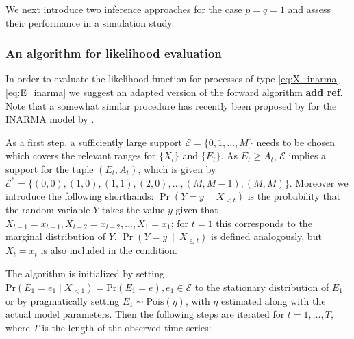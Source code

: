 \documentclass{article}
\begin{document}
We next introduce two inference approaches for the case $p = q = 1$ and assess their performance in a simulation study.

\subsubsection{An algorithm for likelihood evaluation}

In order to evaluate the likelihood function for processes of type \eqref{eq:X_inarma}--\eqref{eq:E_inarma} we suggest an adapted version of the forward algorithm \textbf{add ref}. Note that a somewhat similar procedure has recently been proposed by \cite{Weiss2019} for the INARMA model by \cite{Dion1995}.

As a first step, a sufficiently large support $\mathcal{E} = \{0, 1, \dots, M\}$ needs to be chosen which covers the relevant ranges for $\{X_t\}$ and $\{E_t\}$. As $E_t \geq A_t$, $\mathcal{E}$ implies a support for the tuple $(E_t, A_t)$, which is given by $\mathcal{E}^* = \{(0, 0), (1, 0), (1, 1), (2, 0), \dots, (M, M - 1), (M, M)\}$. Moreover we introduce the following shorthands: $\Pr(Y = y \ \mid \ X_{ < t})$ is the probability that the random variable $Y$ takes the value $y$ given that $X_{t - 1} = x_{t - 1}, X_{t - 2} = x_{t - 2}, \dots, X_1 = x_1$; for $t= 1$ this corresponds to the marginal distribution of $Y$. $\Pr(Y = y \ \mid \ X_{ \leq t})$ is defined analogously, but $X_t = x_t$ is also included in the condition.

The algorithm is initialized by setting $\text{Pr}(E_1 = e_1 \mid X_{< 1}) = \text{Pr}(E_1 = e), e_1 \in \mathcal{E}$ to the stationary distribution of $E_1$ or by pragmatically setting $E_1 \sim \text{Pois}(\eta)$, with $\eta$ estimated along with the actual model parameters. %
Then the following steps are iterated for $t = 1, \dots, T$, where $T$ is the length of the observed time series:
\end{document}
